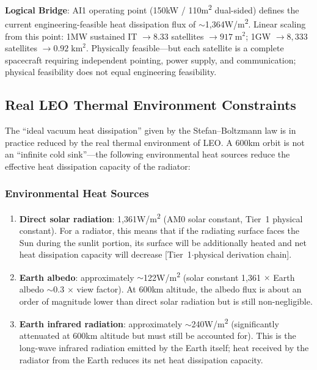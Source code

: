 \textbf{Logical Bridge}: AI1 operating point (150\;kW / 110\;m\textsuperscript{2} dual-sided) defines the current engineering-feasible heat dissipation flux of $\sim$1,364\;W/m\textsuperscript{2}. Linear scaling from this point: 1\;MW sustained IT $\rightarrow 8.33$ satellites $\rightarrow 917\;\text{m}^2$; 1\;GW $\rightarrow 8,333$ satellites $\rightarrow 0.92\;\text{km}^2$. Physically feasible---but each satellite is a complete spacecraft requiring independent pointing, power supply, and communication; physical feasibility does not equal engineering feasibility.

\subsection{Real LEO Thermal Environment Constraints}

The ``ideal vacuum heat dissipation'' given by the Stefan--Boltzmann law is in practice reduced by the real thermal environment of LEO. A 600\;km orbit is not an ``infinite cold sink''---the following environmental heat sources reduce the effective heat dissipation capacity of the radiator:

\subsubsection{Environmental Heat Sources}

\begin{enumerate}[leftmargin=*]
    \item \textbf{Direct solar radiation}: 1,361\;W/m\textsuperscript{2} (AM0 solar constant, Tier~1 physical constant). For a radiator, this means that if the radiating surface faces the Sun during the sunlit portion, its surface will be additionally heated and net heat dissipation capacity will decrease [Tier~1$\cdot$physical derivation chain].
    \item \textbf{Earth albedo}: approximately $\sim$122\;W/m\textsuperscript{2} (solar constant 1,361 $\times$ Earth albedo $\sim$0.3 $\times$ view factor). At 600\;km altitude, the albedo flux is about an order of magnitude lower than direct solar radiation but is still non-negligible.
    \item \textbf{Earth infrared radiation}: approximately $\sim$240\;W/m\textsuperscript{2} (significantly attenuated at 600\;km altitude but must still be accounted for). This is the long-wave infrared radiation emitted by the Earth itself; heat received by the radiator from the Earth reduces its net heat dissipation capacity\cite{clawson2002thermal,nasa2021tm4527}.
\end{enumerate}

